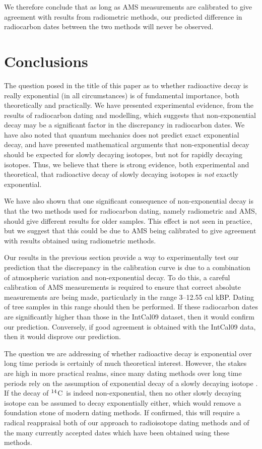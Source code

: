\documentclass[12pt]{article}
\newcommand{\cft}{$^{\rm 14}$C}
\newcommand{\INTCAL}{{\sc IntCal}}
\begin{document}
We therefore conclude that as long as AMS measurements are calibrated to give 
agreement with results from radiometric methods, our predicted
difference in radiocarbon dates between the two methods will never be 
observed.


\section{Conclusions}
\label{conclusion}

The question posed in the title of this paper as to whether radioactive 
decay is really exponential (in all circumstances) is of fundamental 
importance, both theoretically and practically. We have presented 
experimental evidence, from the results of radiocarbon dating and modelling,
which suggests that non-exponential decay may be a significant factor in 
the discrepancy in radiocarbon dates. We have also noted that quantum
mechanics does not predict exact exponential decay, and have presented
mathematical arguments that non-exponential decay should be expected for
slowly decaying isotopes, but not for rapidly decaying isotopes.
Thus, we believe that there is strong evidence, both experimental and
theoretical, that radioactive decay of slowly decaying isotopes is {\em
not} exactly exponential. 

We have also shown that one significant consequence of non-exponential 
decay is that the two methods used for
radiocarbon dating, namely radiometric and AMS, should give different
results for older samples. This effect is not seen in practice, but we 
suggest that this could be due to AMS being calibrated to give agreement 
with results obtained using radiometric methods. 

Our results in the previous section provide a way to experimentally 
test our prediction that the discrepancy in the calibration
curve is due to a combination of atmospheric variation and non-exponential
decay. To do this, a careful calibration of AMS measurements is required 
to ensure that correct absolute measurements are being made, particularly 
in the range 3--12.55 cal kBP. Dating of tree samples in this range should 
then be performed. If these radiocarbon dates are significantly higher than
those in the \INTCAL09 dataset, then it would confirm our prediction.
Conversely, if good agreement is obtained with the \INTCAL09 data, then it
would disprove our prediction.

The question we are addressing of whether radioactive decay is
exponential over long time periods is certainly of much theoretical
interest. However, the stakes are high in more practical realms, since
many dating methods over long time periods rely on the
assumption of exponential decay of a slowly decaying isotope
\cite{aitken90}.
If the decay of \cft~is indeed non-exponential, then no other slowly
decaying isotope can be assumed to decay exponentially either, which would
remove a foundation stone of modern dating methods. If confirmed, this will
require a radical reappraisal both of our approach to radioisotope dating
methods and of the many currently accepted dates which have been obtained 
using these methods.
\vspace{-2mm}
\end{document}
